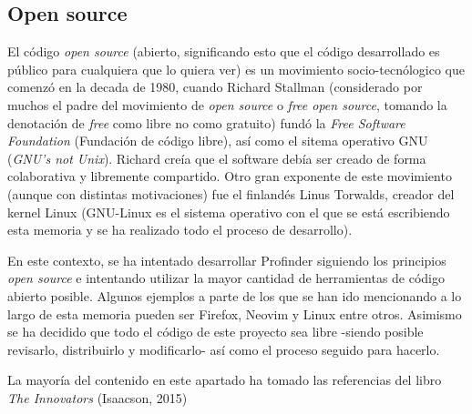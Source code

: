 \subsection{Open source}
\label{subsec:openSource}
El código \textit{open source} (abierto, significando esto que el código desarrollado es público para cualquiera que lo quiera ver)
es un movimiento socio-tecnólogico que comenzó en la decada de 1980, cuando Richard Stallman (considerado por muchos el padre del movimiento de \textit{open source} o \textit{ free open source}, tomando la denotación de \textit{free} como libre no como gratuito) fundó la \textit{Free Software Foundation} (Fundación de código libre)\hyperlink{cap:biblio}{}, así como el sitema operativo GNU\hyperlink{cap:biblio}{} (\textit{GNU's not Unix}). Richard creía que el software debía ser  creado de forma colaborativa y libremente compartido. Otro gran exponente de este movimiento (aunque con distintas motivaciones) fue el finlandés Linus Torwalds, creador del kernel Linux (GNU-Linux es el sistema operativo con el que se está escribiendo esta memoria y se ha realizado todo el proceso de desarrollo).

En este contexto, se ha intentado desarrollar Profinder siguiendo los principios \textit{open source} e intentando utilizar la mayor cantidad de herramientas de código abierto posible. Algunos ejemplos a parte de los que se han ido mencionando a lo largo de esta memoria pueden ser Firefox\hyperlink{cap:biblio}{}, Neovim\hyperlink{cap:biblio}{} y Linux\hyperlink{cap:biblio}{} entre otros. Asimismo se ha decidido que todo el código de este proyecto sea libre -siendo posible revisarlo, distribuirlo y modificarlo- así como el proceso seguido para hacerlo.

La mayoría del contenido en este apartado ha tomado las referencias del libro \textit{The Innovators} (Isaacson, 2015)\hyperlink{cap:biblio}{} 

